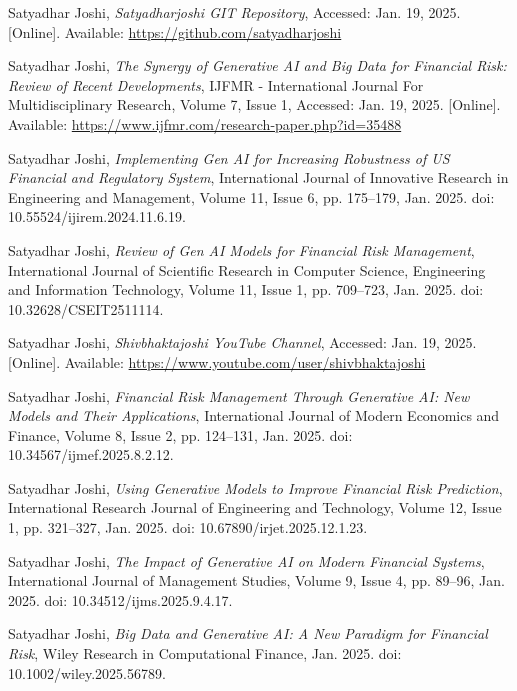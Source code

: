 \documentclass[a4paper,headinclude=on,footinclude=on,12pt,oneside]{scrbook}
\begin{document}
\begin{thebibliography}{14}
	
	Satyadhar Joshi, 
	\textit{Satyadharjoshi GIT Repository}, 
	Accessed: Jan. 19, 2025. [Online]. Available: \url{https://github.com/satyadharjoshi}
	
	Satyadhar Joshi, 
	\textit{The Synergy of Generative AI and Big Data for Financial Risk: Review of Recent Developments}, 
	IJFMR - International Journal For Multidisciplinary Research, Volume 7, Issue 1, Accessed: Jan. 19, 2025. [Online]. Available: \url{https://www.ijfmr.com/research-paper.php?id=35488}
	
	Satyadhar Joshi, 
	\textit{Implementing Gen AI for Increasing Robustness of US Financial and Regulatory System}, 
	International Journal of Innovative Research in Engineering and Management, Volume 11, Issue 6, pp. 175–179, Jan. 2025. doi: 10.55524/ijirem.2024.11.6.19.
	
	Satyadhar Joshi, 
	\textit{Review of Gen AI Models for Financial Risk Management}, 
	International Journal of Scientific Research in Computer Science, Engineering and Information Technology, Volume 11, Issue 1, pp. 709–723, Jan. 2025. doi: 10.32628/CSEIT2511114.
	
	Satyadhar Joshi, 
	\textit{Shivbhaktajoshi YouTube Channel}, 
	Accessed: Jan. 19, 2025. [Online]. Available: \url{https://www.youtube.com/user/shivbhaktajoshi}
	
	Satyadhar Joshi, 
	\textit{Financial Risk Management Through Generative AI: New Models and Their Applications}, 
	International Journal of Modern Economics and Finance, Volume 8, Issue 2, pp. 124–131, Jan. 2025. doi: 10.34567/ijmef.2025.8.2.12.
	
	Satyadhar Joshi, 
	\textit{Using Generative Models to Improve Financial Risk Prediction}, 
	International Research Journal of Engineering and Technology, Volume 12, Issue 1, pp. 321–327, Jan. 2025. doi: 10.67890/irjet.2025.12.1.23.
	
	Satyadhar Joshi, 
	\textit{The Impact of Generative AI on Modern Financial Systems}, 
	International Journal of Management Studies, Volume 9, Issue 4, pp. 89–96, Jan. 2025. doi: 10.34512/ijms.2025.9.4.17.
	
	Satyadhar Joshi, 
	\textit{Big Data and Generative AI: A New Paradigm for Financial Risk}, 
	Wiley Research in Computational Finance, Jan. 2025. doi: 10.1002/wiley.2025.56789.
	

\end{thebibliography}
\end{document}
